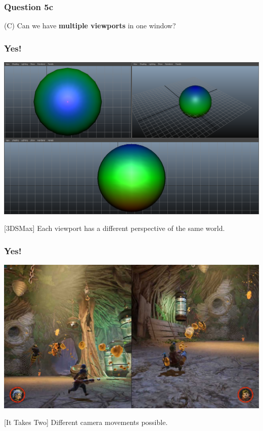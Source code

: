\documentclass{beamer}
\begin{document}
\begin{frame}
    \frametitle{Question 5c}

    (C) Can we have \textbf{multiple viewports} in one window?
\end{frame}

\begin{frame}
    \frametitle{Yes!}

    \begin{center}
        \includegraphics[scale=0.3]{multiple-viewports.png}
    \end{center}

    [3DSMax] Each viewport has a different perspective of the same world.

\end{frame}

\begin{frame}
    \frametitle{Yes!}

    \begin{center}
        \includegraphics[scale=0.2]{it-takes-two.jpg}
    \end{center}

    [It Takes Two] Different camera movements possible.

\end{frame}
\end{document}
